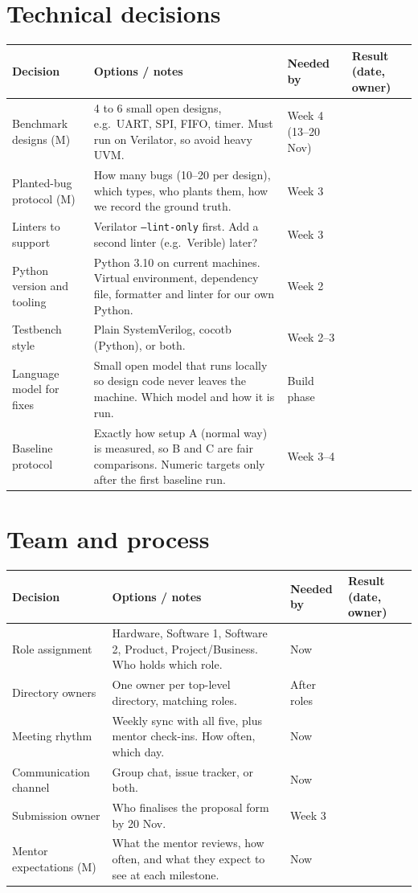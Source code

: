 \documentclass[11pt,a4paper]{article}
\begin{document}
\section{Technical decisions}
\begin{longtable}{p{3.2cm} p{5.3cm} p{2.2cm} p{3.8cm}}
\toprule
\textbf{Decision} & \textbf{Options / notes} & \textbf{Needed by} & \textbf{Result (date, owner)} \\
\midrule
\endhead
Benchmark designs (M) & 4 to 6 small open designs, e.g.\ UART, SPI, FIFO, timer. Must run on Verilator, so avoid heavy UVM. & Week 4 (13--20 Nov) & \\
Planted-bug protocol (M) & How many bugs (10--20 per design), which types, who plants them, how we record the ground truth. & Week 3 & \\
Linters to support & Verilator \texttt{--lint-only} first. Add a second linter (e.g.\ Verible) later? & Week 3 & \\
Python version and tooling & Python 3.10 on current machines. Virtual environment, dependency file, formatter and linter for our own Python. & Week 2 & \\
Testbench style & Plain SystemVerilog, cocotb (Python), or both. & Week 2--3 & \\
Language model for fixes & Small open model that runs locally so design code never leaves the machine. Which model and how it is run. & Build phase & \\
Baseline protocol & Exactly how setup A (normal way) is measured, so B and C are fair comparisons. Numeric targets only after the first baseline run. & Week 3--4 & \\
\bottomrule
\end{longtable}

\section{Team and process}
\begin{longtable}{p{3.2cm} p{5.3cm} p{2.2cm} p{3.8cm}}
\toprule
\textbf{Decision} & \textbf{Options / notes} & \textbf{Needed by} & \textbf{Result (date, owner)} \\
\midrule
\endhead
Role assignment & Hardware, Software 1, Software 2, Product, Project/Business. Who holds which role. & Now & \\
Directory owners & One owner per top-level directory, matching roles. & After roles & \\
Meeting rhythm & Weekly sync with all five, plus mentor check-ins. How often, which day. & Now & \\
Communication channel & Group chat, issue tracker, or both. & Now & \\
Submission owner & Who finalises the proposal form by 20 Nov. & Week 3 & \\
Mentor expectations (M) & What the mentor reviews, how often, and what they expect to see at each milestone. & Now & \\
\bottomrule
\end{longtable}
\end{document}

